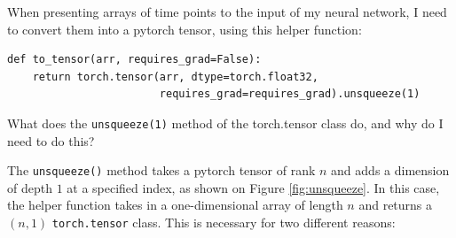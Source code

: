 \documentclass[we,twoside,openright,a4paper,11pt]{uantwerpenbamathesis}
\begin{document}
\begin{tcolorbox}[title=Question 8, colback=blue!10!white, colframe=blue!40!white, sharp corners]
When presenting arrays of time points to the input of my neural network, I need to convert them into a pytorch tensor, using this helper function:
\begin{tcolorbox}[colback=gray!10!white, colframe=gray!40!white]
\begin{verbatim}
def to_tensor(arr, requires_grad=False):
    return torch.tensor(arr, dtype=torch.float32,
                        requires_grad=requires_grad).unsqueeze(1)
\end{verbatim}
\end{tcolorbox}
What does the \verb|unsqueeze(1)| method of the torch.tensor class do, and why do I need to do this?
\end{tcolorbox}
The \verb|unsqueeze()| method takes a pytorch tensor of rank $n$ and adds a dimension of depth $1$ at a specified index, as shown on Figure \ref{fig:unsqueeze}. In this case, the helper function takes in a one-dimensional array of length $n$ and returns a $(n, 1)$ \verb|torch.tensor| class. This is necessary for two different reasons:
\end{document}

